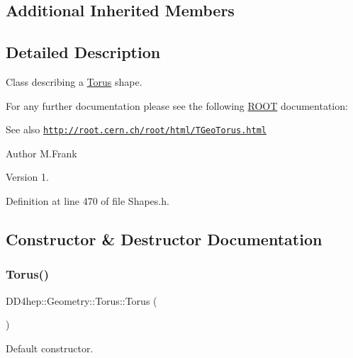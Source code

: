\subsection*{Additional Inherited Members}


\subsection{Detailed Description}
Class describing a \hyperlink{class_d_d4hep_1_1_geometry_1_1_torus}{Torus} shape. 

For any further documentation please see the following \hyperlink{namespace_r_o_o_t}{R\+O\+OT} documentation\+: \begin{DoxySeeAlso}{See also}
\href{http://root.cern.ch/root/html/TGeoTorus.html}{\tt http\+://root.\+cern.\+ch/root/html/\+T\+Geo\+Torus.\+html}
\end{DoxySeeAlso}
\begin{DoxyAuthor}{Author}
M.\+Frank 
\end{DoxyAuthor}
\begin{DoxyVersion}{Version}
1. 
\end{DoxyVersion}


Definition at line 470 of file Shapes.\+h.



\subsection{Constructor \& Destructor Documentation}
\hypertarget{class_d_d4hep_1_1_geometry_1_1_torus_a11dd17c49ab39945dd80dccaa9cbbd2a}{}\label{class_d_d4hep_1_1_geometry_1_1_torus_a11dd17c49ab39945dd80dccaa9cbbd2a} 
\subsubsection{\texorpdfstring{Torus()}{Torus()}\hspace{0.1cm}{\footnotesize\ttfamily [1/6]}}
{\footnotesize\ttfamily D\+D4hep\+::\+Geometry\+::\+Torus\+::\+Torus (\begin{DoxyParamCaption}{ }\end{DoxyParamCaption})\hspace{0.3cm}{\ttfamily [default]}}



Default constructor. 

